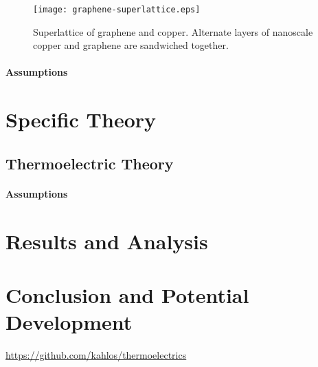 \documentclass[12pt,draft]{article}
\begin{document}
\begin{figure}
	\centering
	\texttt{[image: graphene-superlattice.eps]}
	\caption{Superlattice of graphene and copper. Alternate layers of nanoscale copper and graphene are sandwiched together.}
	\label{fig:superlattice}
\end{figure}

\paragraph{Assumptions}

\section{Specific Theory}
\subsection{Thermoelectric Theory}
\paragraph{Assumptions}

\section{Results and Analysis}

\section{Conclusion and Potential Development}

\url{https://github.com/kahlos/thermoelectrics}
\end{document}

